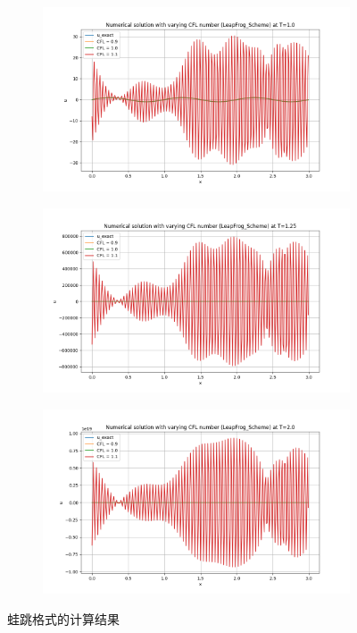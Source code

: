 \documentclass[12pt, a4paper]{article}
\begin{document}
\begin{figure}[htbp]
    \centering
    \begin{subfigure}[b]{0.45\textwidth} 
        \centering
        \includegraphics[width=\textwidth]{./pictures/Stablity_of_LeapFrog_Scheme_at_1.0.png} 
    \end{subfigure}
    \hfill
    \begin{subfigure}[b]{0.45\textwidth} 
        \centering
        \includegraphics[width=\textwidth]{./pictures/Stablity_of_LeapFrog_Scheme_at_1.25.png} 
    \end{subfigure}
    \vspace{0.5cm}
    \centering
    \begin{subfigure}[b]{0.45\textwidth} 
        \centering
        \includegraphics[width=\textwidth]{./pictures/Stablity_of_LeapFrog_Scheme_at_2.0.png} 
    \end{subfigure}
    \caption{蛙跳格式的计算结果}
\end{figure}
\end{document}
